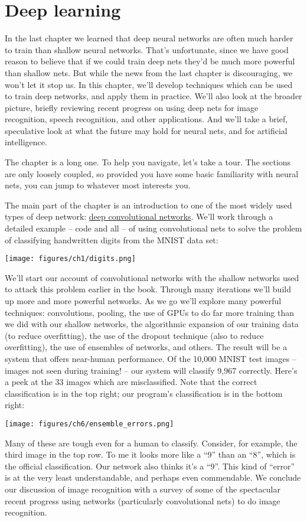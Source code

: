 \documentclass[a4paper,twoside,10pt]{book}
\begin{document}
\chapter{Deep learning}
In the last chapter we learned that deep neural networks are often much harder to train than shallow neural networks. That's unfortunate, since we have good reason to believe that if we could train deep nets they'd be much more powerful than shallow nets. But while the news from the last chapter is discouraging, we won't let it stop us. In this chapter, we'll develop techniques which can be used to train deep networks, and apply them in practice. We'll also look at the broader picture, briefly reviewing recent progress on using deep nets for image recognition, speech recognition, and other applications. And we'll take a brief, speculative look at what the future may hold for neural nets, and for artificial intelligence.

The chapter is a long one. To help you navigate, let's take a tour. The sections are only loosely coupled, so provided you have some basic familiarity with neural nets, you can jump to whatever most interests you.

The main part of the chapter is an introduction to one of the most widely used types of deep network: \hyperref[subseq:cnn]{deep convolutional networks}. We'll work through a detailed example -- code and all -- of using convolutional nets to solve the problem of classifying handwritten digits from the MNIST data set:
\begin{center}
	\texttt{[image: figures/ch1/digits.png]}
\end{center}
We'll start our account of convolutional networks with the shallow networks used to attack this problem earlier in the book. Through many iterations we'll build up more and more powerful networks. As we go we'll explore many powerful techniques: convolutions, pooling, the use of GPUs to do far more training than we did with our shallow networks, the algorithmic expansion of our training data (to reduce overfitting), the use of the dropout technique (also to reduce overfitting), the use of ensembles of networks, and others. The result will be a system that offers near-human performance. Of the 10,000 MNIST test images -- images not seen during training! -- our system will classify 9,967 correctly. Here's a peek at the 33 images which are misclassified. Note that the correct classification is in the top right; our program's classification is in the bottom right:
\begin{center}
	\texttt{[image: figures/ch6/ensemble\_errors.png]}
\end{center}
Many of these are tough even for a human to classify. Consider, for example, the third image in the top row. To me it looks more like a ``9'' than an ``8'', which is the official classification. Our network also thinks it's a ``9''. This kind of ``error'' is at the very least understandable, and perhaps even commendable. We conclude our discussion of image recognition with a survey of some of the spectacular recent progress using networks (particularly convolutional nets) to do image recognition.
\end{document}
